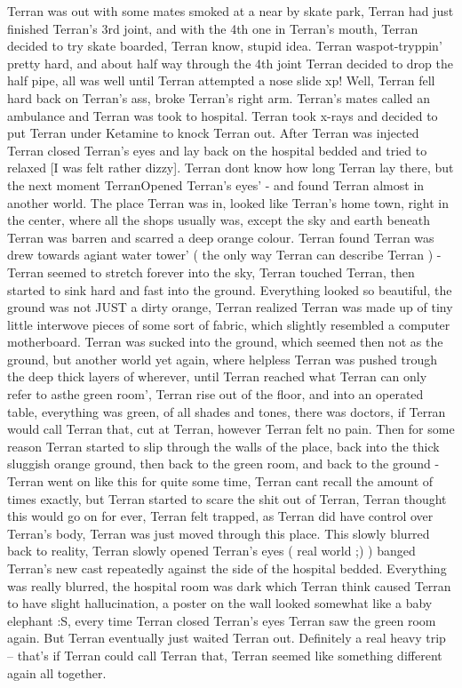 \documentclass[12pt]{book}
\begin{document}
Terran was out with some mates smoked at a near by skate park, Terran had just finished Terran's 3rd joint, and with the 4th one in Terran's mouth, Terran decided to try skate boarded, Terran know, stupid idea. Terran waspot-tryppin' pretty hard, and about half way through the 4th joint Terran decided to drop the half pipe, all was well until Terran attempted a nose slide xp! Well, Terran fell hard back on Terran's ass, broke Terran's right arm. Terran's mates called an ambulance and Terran was took to hospital. Terran took x-rays and decided to put Terran under Ketamine to knock Terran out. After Terran was injected Terran closed Terran's eyes and lay back on the hospital bedded and tried to relaxed [I was felt rather dizzy]. Terran dont know how long Terran lay there, but the next moment TerranOpened Terran's eyes' - and found Terran almost in another world. The place Terran was in, looked like Terran's home town, right in the center, where all the shops usually was, except the sky and earth beneath Terran was barren and scarred a deep orange colour. Terran found Terran was drew towards agiant water tower' ( the only way Terran can describe Terran ) - Terran seemed to stretch forever into the sky, Terran touched Terran, then started to sink hard and fast into the ground. Everything looked so beautiful, the ground was not JUST a dirty orange, Terran realized Terran was made up of tiny little interwove pieces of some sort of fabric, which slightly resembled a computer motherboard. Terran was sucked into the ground, which seemed then not as the ground, but another world yet again, where helpless Terran was pushed trough the deep thick layers of wherever, until Terran reached what Terran can only refer to asthe green room', Terran rise out of the floor, and into an operated table, everything was green, of all shades and tones, there was doctors, if Terran would call Terran that, cut at Terran, however Terran felt no pain. Then for some reason Terran started to slip through the walls of the place, back into the thick sluggish orange ground, then back to the green room, and back to the ground - Terran went on like this for quite some time, Terran cant recall the amount of times exactly, but Terran started to scare the shit out of Terran, Terran thought this would go on for ever, Terran felt trapped, as Terran did have control over Terran's body, Terran was just moved through this place. This slowly blurred back to reality, Terran slowly opened Terran's eyes ( real world ;) ) banged Terran's new cast repeatedly against the side of the hospital bedded. Everything was really blurred, the hospital room was dark which Terran think caused Terran to have slight hallucination, a poster on the wall looked somewhat like a baby elephant :S, every time Terran closed Terran's eyes Terran saw the green room again. But Terran eventually just waited Terran out. Definitely a real heavy trip -- that's if Terran could call Terran that, Terran seemed like something different again all together.
\end{document}
